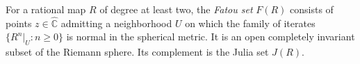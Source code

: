 
For a rational map $R$ of degree at least two, the \emph{Fatou set} $F(R)$ consists of points $z\in\widehat{\mathbb C}$ admitting a neighborhood $U$ on which the family of iterates $\{R^n|_U:n\ge0\}$ is normal in the spherical metric. It is an open completely invariant subset of the Riemann sphere. Its complement is the Julia set $J(R)$.
